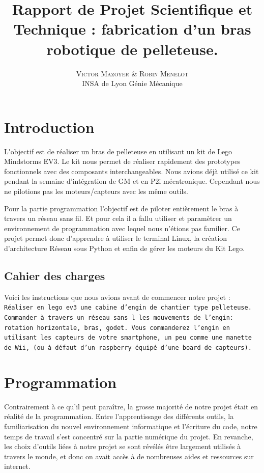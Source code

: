 \documentclass[twoside,twocolumn, 16pt]{article}
\title{Rapport de Projet Scientifique et Technique : fabrication d'un bras robotique de pelleteuse.} %
\author{%
\textsc{Victor Mazoyer \& Robin Menelot} \\[1ex] %
\normalsize INSA de Lyon \quad Génie Mécanique \\ %
}
\date{} %
\begin{document}
\maketitle


\section{Introduction}

\lettrine[nindent=0em,lines=3]{L}'objectif est de réaliser un bras de pelleteuse en utilisant un kit de Lego Mindstorms EV3. 
Le kit nous permet de réaliser rapidement des prototypes fonctionnels avec des composants interchangeables.  Nous avions déjà utilisé ce kit pendant la semaine d'intégration de GM et en P2i mécatronique. Cependant nous ne pilotions pas les moteurs/capteurs avec les même outils.

Pour la partie programmation l'objectif est de piloter entièrement le bras à travers un réseau sans fil. Et pour cela il a fallu utiliser et paramètrer un environnement de programmation avec lequel nous n'étions pas familier. Ce projet permet donc d'apprendre à utiliser le terminal Linux, la création d'architecture Réseau sous Python et enfin de gérer les moteurs du Kit Lego.

\subsection{Cahier des charges}
\begin{displayquote}
Voici les instructions que nous avions avant de commencer notre projet : \\
\texttt{Réaliser en lego ev3 une cabine d'engin de chantier type pelleteuse. Commander à travers un réseau sans l les mouvements de l'engin: rotation horizontale, bras, godet. Vous commanderez l'engin en utilisant les capteurs de votre smartphone, un peu comme une manette de Wii, (ou à défaut d'un raspberry équipé d'une board de capteurs).}
\end{displayquote}

\section{Programmation}
Contrairement à ce qu’il peut paraître, la grosse majorité de notre projet était en réalité de la programmation. Entre l’apprentissage des différents outils, la familiarisation du nouvel environnement informatique et l’écriture du code, notre temps de travail s’est concentré sur la partie numérique du projet. En revanche, les choix d’outils liées à notre projet se sont révélés être largement utilisés à travers le monde, et donc on avait accès à de nombreuses aides et ressources sur internet.
\end{document}
